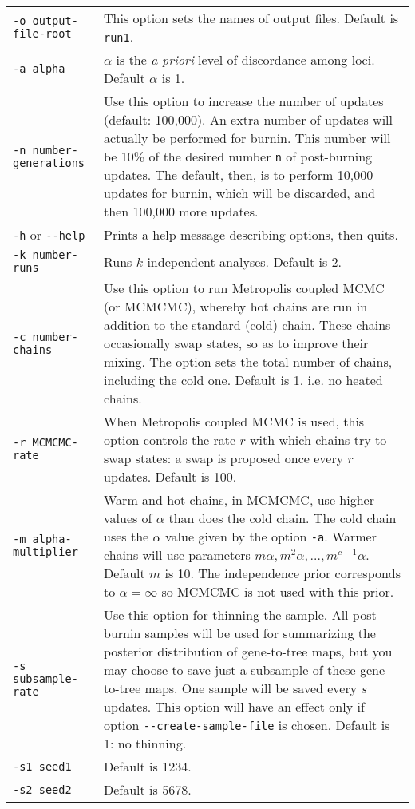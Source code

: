 \documentclass[12pt,english,final,letterpaper]{article}
\begin{document}
\bigskip

\noindent
\hspace*{-.2in}
\begin{tabular}{l|p{4.6in}}
{\tt -o output-file-root}&This option sets the names of output 
files. Default is {\tt run1}.\\
{\tt -a alpha}&$\alpha$ is the {\it a priori} level of discordance among 
loci. Default $\alpha$ is 1.\\
{\tt -n number-generations}&Use this option to increase the number of 
updates (default: 100,000). An extra number of updates will actually be 
performed for burnin. This number will be 10\% of the desired number {\tt n} 
of post-burning updates. The default, then, is to perform 10,000 updates for 
burnin, which will be discarded, and then 100,000 more updates.\\
{\tt -h} or \verb+--help+&Prints a help message describing options,
then quits.\\
{\tt -k number-runs}&Runs $k$ independent analyses. Default is 2.\\
{\tt -c number-chains}&Use this option to run Metropolis coupled MCMC (or MCMCMC), 
whereby hot chains are run in addition to the standard (cold) chain. 
These chains occasionally swap states, so as to improve their mixing. 
The option sets the total number of chains, including the cold one. 
Default is 1, i.e. no heated chains.\\
{\tt -r MCMCMC-rate}&When Metropolis coupled MCMC is used, this option
controls the rate $r$ with which chains try to swap states: a swap
is proposed once every $r$ updates. Default is 100.\\
{\tt -m alpha-multiplier}&Warm and hot chains, in MCMCMC, use higher values 
of $\alpha$ than does the cold chain. The cold chain uses the $\alpha$ value 
given by the option {\tt -a}. Warmer chains will use parameters 
$m\alpha, m^2\alpha,\dots, m^{c-1}\alpha$. Default $m$ is 10.
The independence prior corresponds to $\alpha=\infty$ so MCMCMC is not used
with this prior.\\
{\tt -s subsample-rate}&Use this option for thinning the sample. All post-burnin samples
will be used for summarizing the posterior distribution of gene-to-tree maps, 
but you may choose to save just a subsample of these gene-to-tree maps. One sample
will be saved every $s$ updates. This option will have an effect only if option
\verb+--create-sample-file+ is chosen. Default is 1: no thinning.\\
{\tt -s1 seed1}&Default is 1234. 
\\
{\tt -s2 seed2}&Default is 5678.
\end{tabular}
\end{document}

